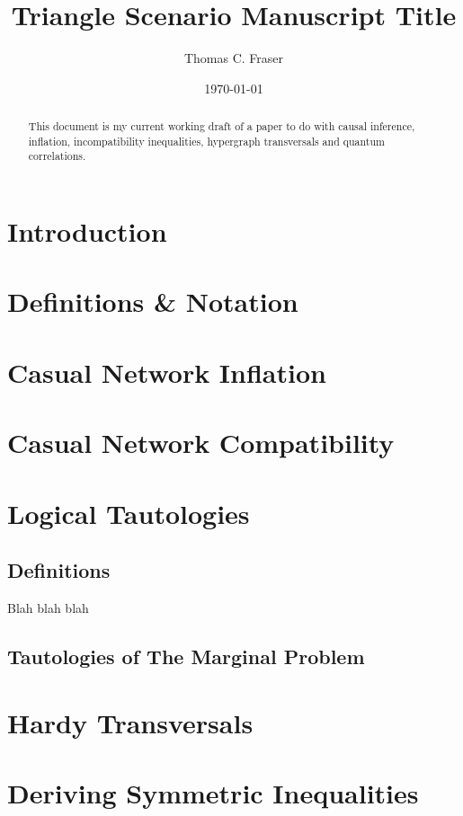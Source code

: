 \documentclass[aps, english, twoside, pra, longbibliography]{revtex4-1}
\begin{document}
    \title{Triangle Scenario Manuscript Title}
    \author{Thomas C. Fraser}
    \date{\today}
    \begin{abstract}
        This document is my current working draft of a paper to do with causal inference, inflation, incompatibility inequalities, hypergraph transversals and quantum correlations.
    \end{abstract}
    \maketitle

    \section{Introduction}
    \section{Definitions \& Notation}
    \section{Casual Network Inflation}
    \section{Casual Network Compatibility}
    \section{Logical Tautologies}
    \subsection{Definitions}
    Blah blah blah \cite{Mansfield_2012}
    \subsection{Tautologies of The Marginal Problem}
    \section{Hardy Transversals}
    \section{Deriving Symmetric Inequalities}
\end{document}
